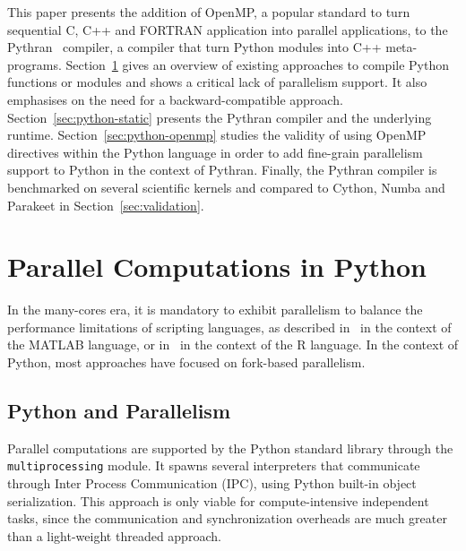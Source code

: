 \documentclass[conference]{IEEEtran}
\begin{document}
This paper presents the addition of OpenMP, a popular standard to turn
sequential C, C++ and FORTRAN application into parallel applications, to the
Pythran~\cite{pythran2013} compiler, a compiler that turn Python modules into
C++ meta-programs.  Section~\ref{sec:python-parallel} gives an overview of
existing approaches to compile Python functions or modules and shows a critical
lack of parallelism support. It also emphasises on the need for a
backward-compatible approach. Section~\ref{sec:python-static} presents the
Pythran compiler and the underlying runtime. Section~\ref{sec:python-openmp}
studies the validity of using OpenMP directives within the Python language in
order to add fine-grain parallelism support to Python in the context of Pythran.
Finally, the Pythran compiler is benchmarked on several scientific kernels and
compared to Cython, Numba and Parakeet in Section~\ref{sec:validation}.

\section{Parallel Computations in Python}\label{sec:python-parallel}

In the many-cores era, it is mandatory to exhibit parallelism to balance the
performance limitations of scripting languages, as described in~\cite{choy05}
in the context of the MATLAB language, or in~\cite{mals07} in the context of
the R language. In the context of Python, most approaches have focused on
fork-based parallelism.

\subsection{Python and Parallelism}

Parallel computations are supported by the Python standard library through the
\texttt{multiprocessing} module. It spawns several interpreters that
communicate through Inter Process Communication (IPC), using Python built-in
object serialization. This approach is only viable for compute-intensive
independent tasks, since the communication and synchronization overheads are
much greater than a light-weight threaded approach.
\end{document}
